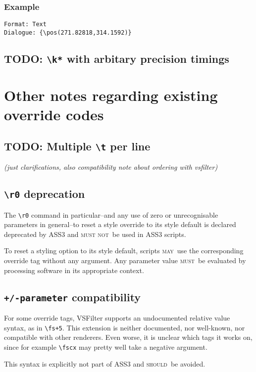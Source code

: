 \documentclass[11pt,a4paper]{article}
\newcommand{\todo}{\textbf\textsf{\color{hl}TODO: }}
\newcommand{\ann}[1]{\textit\textsf{\color{ann}#1}}
\newcommand{\may}{\textsc{may}}
\newcommand{\should}{\textsc{should}}
\newcommand{\must}{\textsc{must}}
\newcommand{\mustnot}{\textsc{must not}}
\newcommand{\oc}[1]{\texttt{\textbackslash #1}}
\begin{document}
\subsubsection*{Example}
\begin{verbatim}
Format: Text
Dialogue: {\pos(271.82818,314.1592)}
\end{verbatim}

\subsection{\todo \oc{k*} with arbitary precision timings}

\section{Other notes regarding existing override codes}
\subsection{\todo Multiple \oc{t} per line}
\ann{(just clarifications, also compatibility note about ordering with vsfilter)}

\subsection{\oc{r0} deprecation}

The \oc{r0} command in particular--and any use of zero or unrecognisable
parameters in general--to reset a style override to its style default is
declared deprecated by ASS3 and \mustnot\ be used in ASS3 scripts.

To reset a styling option to its style default, scripts \may\ use the
corresponding override tag without any argument. Any parameter value
\must\ be evaluated by processing software in its appropriate context.

\subsection{\texttt{+/-parameter} compatibility}

For some override tags, VSFilter supports an undocumented relative value
syntax, as in \oc{fs+5}. This extension is neither documented, nor well-known,
nor compatible with other renderers. Even worse, it is unclear which tags
it works on, since for example \oc{fscx} may pretty well take a negative
argument.

This syntax is explicitly not part of ASS3 and \should\ be avoided.
\end{document}

